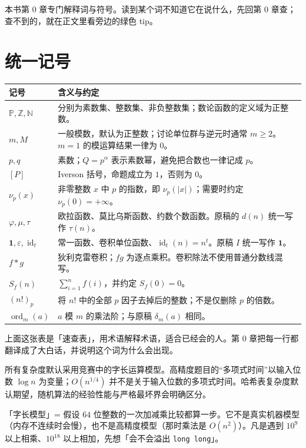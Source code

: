 \documentclass[UTF8,a4paper,11pt,oneside,openany,fontset=fandol]{ctexbook}
\theoremstyle{definition}
\newcommand{\Z}{\mathbb Z}
\newcommand{\N}{\mathbb N}
\newcommand{\Pp}{\mathbb P}
\newcommand{\eps}{\varepsilon}
\newcommand{\one}{\mathbf 1}
\newcommand{\id}{\operatorname{id}}
\newcommand{\ord}{\operatorname{ord}}
\newcommand{\iva}[1]{\left[#1\right]}
\begin{document}
\begin{tip}
本书第 0 章专门解释词与符号。读到某个词不知道它在说什么，先回第 0 章查；查不到的，就在正文里看旁边的绿色 tip。
\end{tip}


\section*{统一记号}
\begin{longtable}{p{}p{}}
\toprule
记号 & 含义与约定\\\midrule
$\Pp,\Z,\N$ & 分别为素数集、整数集、非负整数集；数论函数的定义域为正整数。\\
$m,M$ & 一般模数，默认为正整数；讨论单位群与逆元时通常 $m\ge2$。$m=1$ 的模运算结果一律为 $0$。\\
$p,q$ & 素数；$Q=p^\alpha$ 表示素数幂，避免把合数也一律记成 $p$。\\
$\iva{P}$ & Iverson 括号，命题成立为 $1$，否则为 $0$。\\
$\nu_p(x)$ & 非零整数 $x$ 中 $p$ 的指数，即 $\nu_p(|x|)$；需要时约定 $\nu_p(0)=+\infty$。\\
$\varphi,\mu,\tau$ & 欧拉函数、莫比乌斯函数、约数个数函数。原稿的 $d(n)$ 统一写作 $\tau(n)$。\\
$\one,\eps,\id_t$ & 常一函数、卷积单位函数、$\id_t(n)=n^t$。原稿 $I$ 统一写作 $\one$。\\
$f*g$ & 狄利克雷卷积；$fg$ 为逐点乘积。卷积除法不使用普通分数线混写。\\
$S_f(n)$ & $\sum_{i=1}^n f(i)$，并约定 $S_f(0)=0$。\\
$(n!)_p$ & 将 $n!$ 中的全部 $p$ 因子去掉后的整数；不是仅删除 $p$ 的倍数。\\
$\ord_m(a)$ & $a$ 模 $m$ 的乘法阶；与原稿 $\delta_m(a)$ 相同。\\
\bottomrule
\end{longtable}

\begin{tip}
上面这张表是「速查表」，用术语解释术语，适合已经会的人。第 0 章把每一行都翻译成了大白话，并说明这个词为什么会出现。
\end{tip}


所有复杂度默认采用竞赛中的字长运算模型。高精度题目的“多项式时间”以输入位数 $\log n$ 为变量；$O(n^{1/4})$ 并不是关于输入位数的多项式时间。哈希表复杂度默认期望，随机算法的经验性能与严格最坏界会明确区分。

\begin{tip}
「字长模型」= 假设 $64$ 位整数的一次加减乘比较都算一步。它不是真实机器模型（内存不连续时会慢），也不是高精度模型（那时乘法是 $O(n^2)$）。凡是遇到 $10^9$ 以上相乘、$10^{18}$ 以上相加，先想「会不会溢出 \texttt{long long}」。
\end{tip}
\end{document}
